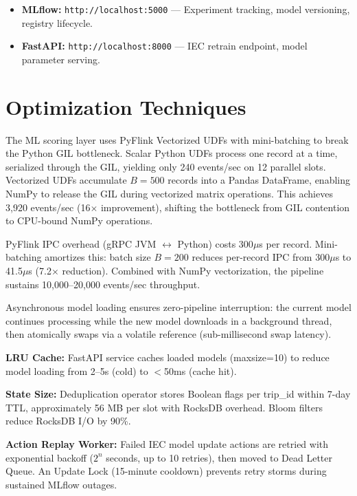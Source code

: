 \begin{itemize}
    \item \textbf{MLflow:} \texttt{http://localhost:5000} --- Experiment tracking, model versioning, registry lifecycle.
    \item \textbf{FastAPI:} \texttt{http://localhost:8000} --- IEC retrain endpoint, model parameter serving.
\end{itemize}

\section{Optimization Techniques}

The ML scoring layer uses PyFlink Vectorized UDFs with mini-batching to break the Python GIL bottleneck. Scalar Python UDFs process one record at a time, serialized through the GIL, yielding only 240 events/sec on 12 parallel slots. Vectorized UDFs accumulate $B = 500$ records into a Pandas DataFrame, enabling NumPy to release the GIL during vectorized matrix operations. This achieves 3,920 events/sec (16$\times$ improvement), shifting the bottleneck from GIL contention to CPU-bound NumPy operations.

PyFlink IPC overhead (gRPC JVM $\leftrightarrow$ Python) costs 300$\mu$s per record. Mini-batching amortizes this: batch size $B = 200$ reduces per-record IPC from 300$\mu$s to 41.5$\mu$s (7.2$\times$ reduction). Combined with NumPy vectorization, the pipeline sustains 10,000--20,000 events/sec throughput.

Asynchronous model loading ensures zero-pipeline interruption: the current model continues processing while the new model downloads in a background thread, then atomically swaps via a volatile reference (sub-millisecond swap latency).

\textbf{LRU Cache:} FastAPI service caches loaded models (maxsize=10) to reduce model loading from 2--5s (cold) to $<$50ms (cache hit).

\textbf{State Size:} Deduplication operator stores Boolean flags per trip\_id within 7-day TTL, approximately 56 MB per slot with RocksDB overhead. Bloom filters reduce RocksDB I/O by 90\%.

\textbf{Action Replay Worker:} Failed IEC model update actions are retried with exponential backoff ($2^n$ seconds, up to 10 retries), then moved to Dead Letter Queue. An Update Lock (15-minute cooldown) prevents retry storms during sustained MLflow outages.


